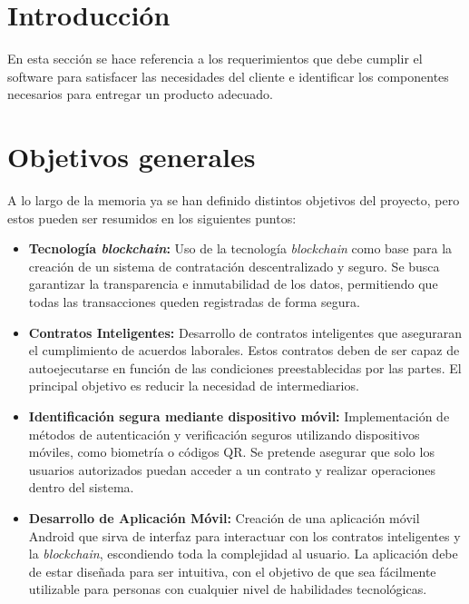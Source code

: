 
\section{Introducción}

En esta sección se hace referencia a los requerimientos que debe cumplir el software para satisfacer las necesidades del cliente e identificar los componentes necesarios para entregar un producto adecuado. 


\section{Objetivos generales}

A lo largo de la memoria ya se han definido distintos objetivos del proyecto, pero estos pueden ser resumidos en los siguientes puntos:

\begin{itemize}

\item \textbf{Tecnología \textit{blockchain}:} Uso de la tecnología \textit{blockchain} como base para la creación de un sistema de contratación descentralizado y seguro.
Se busca garantizar la transparencia e inmutabilidad de los datos, permitiendo que todas las transacciones queden registradas de forma segura.

\item \textbf{Contratos Inteligentes:} Desarrollo de contratos inteligentes que aseguraran el cumplimiento de acuerdos laborales.
Estos contratos deben de ser capaz de autoejecutarse en función de las condiciones preestablecidas por las partes. El principal objetivo es reducir la necesidad de intermediarios.

\item \textbf{Identificación segura mediante dispositivo móvil:} Implementación de métodos de autenticación y verificación seguros utilizando dispositivos móviles, como biometría o códigos QR.
Se pretende asegurar que solo los usuarios autorizados puedan acceder a un contrato y realizar operaciones dentro del sistema.

\item \textbf{Desarrollo de Aplicación Móvil:} Creación de una aplicación móvil Android que sirva de interfaz para interactuar con los contratos inteligentes y la \textit{blockchain}, escondiendo toda la complejidad al usuario.
La aplicación debe de estar diseñada para ser intuitiva, con el objetivo de que sea fácilmente utilizable para personas con cualquier nivel de habilidades tecnológicas.

\end{itemize}

